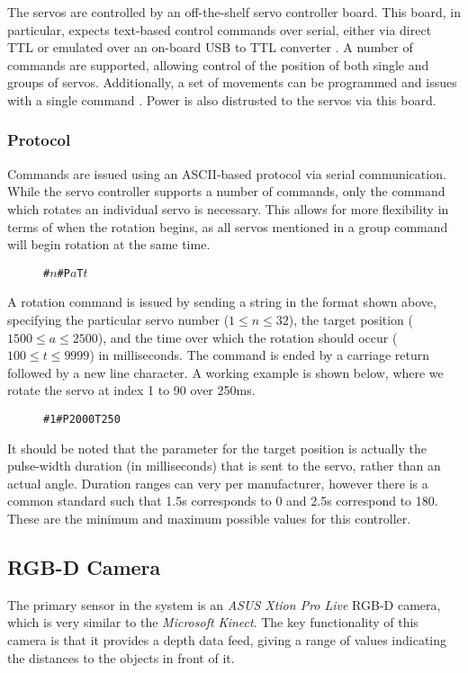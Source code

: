 The servos are controlled by an off-the-shelf servo controller board. This board, in particular, expects text-based control commands over serial, either via direct TTL or emulated over an on-board USB to TTL converter \cite{torobot_manual}. A number of commands are supported, allowing control of the position of both single and groups of servos. Additionally, a set of movements can be programmed and issues with a single command \cite{torobot_manual}. Power is also distrusted to the servos via this board.

\subsubsection{Protocol}

Commands are issued using an ASCII-based protocol via serial communication. While the servo controller supports a number of commands, only the command which rotates an individual servo is necessary. This allows for more flexibility in terms of when the rotation begins, as all servos mentioned in a group command will begin rotation at the same time.

\begin{figure}[!h]
    \centering
    \texttt{\#\(n\)\#P\(a\)T\(t\)}
\end{figure}

A rotation command is issued by sending a string in the format shown above, specifying the particular servo number ($1 \leq n \leq 32$), the target position ($1500 \leq a \leq 2500$), and the time over which the rotation should occur ($100 \leq t \leq 9999$) in milliseconds. The command is ended by a carriage return followed by a new line character. A working example is shown below, where we rotate the servo at index 1 to 90\textdegree{} over 250ms.

\begin{figure}[!h]
    \centering
    \texttt{\#1\#P2000T250}
\end{figure}

It should be noted that the parameter for the target position is actually the pulse-width duration (in milliseconds) that is sent to the servo, rather than an actual angle. Duration ranges can very per manufacturer, however there is a common standard such that 1.5\textmu s corresponds to 0\textdegree{} and 2.5\textmu s correspond to 180\textdegree. These are the minimum and maximum possible values for this controller. 

\subsection{RGB-D Camera}
The primary sensor in the system is an \emph{ASUS Xtion Pro Live} RGB-D camera, which is very similar to the \emph{Microsoft Kinect}. The key functionality of this camera is that it provides a depth data feed, giving a range of values indicating the distances to the objects in front of it.

